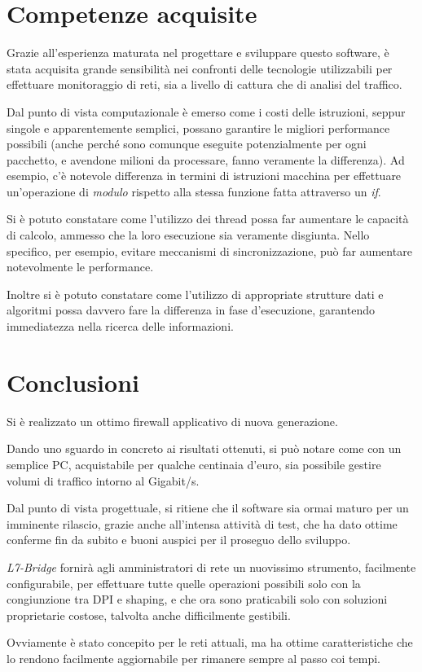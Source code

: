 \section{Competenze acquisite}

Grazie all'esperienza maturata nel progettare e sviluppare questo software, è stata acquisita grande sensibilità nei confronti delle tecnologie utilizzabili per effettuare monitoraggio di reti, sia a livello di cattura che di analisi del traffico.

Dal punto di vista computazionale è emerso come i costi delle istruzioni, seppur singole e apparentemente semplici, possano garantire le migliori performance possibili (anche perché sono comunque eseguite potenzialmente per ogni pacchetto, e avendone milioni da processare, fanno veramente la differenza). Ad esempio, c'è notevole differenza in termini di istruzioni macchina per effettuare un'operazione di \emph{modulo} rispetto alla stessa funzione fatta attraverso un \emph{if}.

Si è potuto constatare come l'utilizzo dei thread possa far aumentare le capacità di calcolo, ammesso che la loro esecuzione sia veramente disgiunta. Nello specifico, per esempio, evitare meccanismi di sincronizzazione, può far aumentare notevolmente le performance.

Inoltre si è potuto constatare come l'utilizzo di appropriate strutture dati e algoritmi possa davvero fare la differenza in fase d'esecuzione, garantendo immediatezza nella ricerca delle informazioni.

\section{Conclusioni}

Si è realizzato un ottimo firewall applicativo di nuova generazione.

Dando uno sguardo in concreto ai risultati ottenuti, si può notare come con un semplice PC, acquistabile per qualche centinaia d'euro, sia possibile gestire volumi di traffico intorno al Gigabit/s.

Dal punto di vista progettuale, si ritiene che il software sia ormai maturo per un imminente rilascio, grazie anche all'intensa attività di test, che ha dato ottime conferme fin da subito e buoni auspici per il proseguo dello sviluppo.

\emph{L7-Bridge} fornirà agli amministratori di rete un nuovissimo strumento, facilmente configurabile, per effettuare tutte quelle operazioni possibili solo con la congiunzione tra DPI e shaping, e che ora sono praticabili solo con soluzioni proprietarie costose, talvolta anche difficilmente gestibili.

Ovviamente è stato concepito per le reti attuali, ma ha ottime caratteristiche che lo rendono facilmente aggiornabile per rimanere sempre al passo coi tempi.